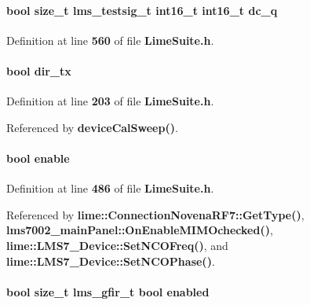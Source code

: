 \paragraph[{dc\+\_\+q}]{\setlength{\rightskip}{0pt plus 5cm}bool size\+\_\+t {\bf lms\+\_\+testsig\+\_\+t} int16\+\_\+t int16\+\_\+t dc\+\_\+q}\label{group__FN__HIGH__LVL_gad41ae41bcc2ea56cf92e419bd439c175}


Definition at line {\bf 560} of file {\bf Lime\+Suite.\+h}.

\paragraph[{dir\+\_\+tx}]{\setlength{\rightskip}{0pt plus 5cm}bool dir\+\_\+tx}\label{group__FN__HIGH__LVL_ga4310b6cbe0d1f02c0d8bacadf8fa09a2}


Definition at line {\bf 203} of file {\bf Lime\+Suite.\+h}.



Referenced by {\bf device\+Cal\+Sweep()}.

\paragraph[{enable}]{\setlength{\rightskip}{0pt plus 5cm}bool enable}\label{group__FN__HIGH__LVL_gac842b6c1dcb3b1f11b611620199dc55c}


Definition at line {\bf 486} of file {\bf Lime\+Suite.\+h}.



Referenced by {\bf lime\+::\+Connection\+Novena\+R\+F7\+::\+Get\+Type()}, {\bf lms7002\+\_\+main\+Panel\+::\+On\+Enable\+M\+I\+M\+Ochecked()}, {\bf lime\+::\+L\+M\+S7\+\_\+\+Device\+::\+Set\+N\+C\+O\+Freq()}, and {\bf lime\+::\+L\+M\+S7\+\_\+\+Device\+::\+Set\+N\+C\+O\+Phase()}.

\paragraph[{enabled}]{\setlength{\rightskip}{0pt plus 5cm}bool size\+\_\+t {\bf lms\+\_\+gfir\+\_\+t} bool enabled}\label{group__FN__HIGH__LVL_ga1e1d534b839ac81817fcbab4f8d5c070}


